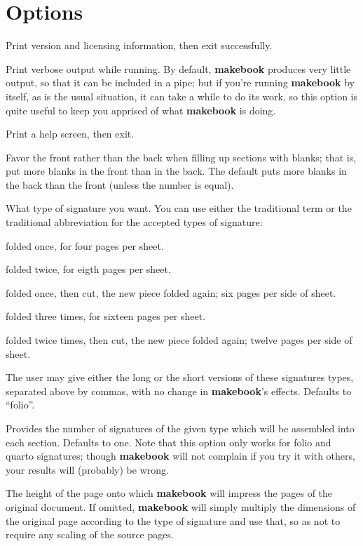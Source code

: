 \documentclass[12pt,twoside,final]{extarticle}
\begin{document}
\section{Options}
\begin{description}[noitemsep]
\item[-V]Print version and licensing information, then exit successfully.
\item[-v]Print verbose output while running. By default, \textbf{makebook} produces very little output, so that it can be included in a pipe; but if you're running \textbf{makebook} by itself, as is the usual situation, it can take a while to do its work, so this option is quite useful to keep you apprised of what \textbf{makebook} is doing.
\item[-h]Print a help screen, then exit.
\item[-f]Favor the front rather than the back when filling up sections with blanks; that is, put more blanks in the front than in the back. The default puts more blanks in the back than the front (unless the number is equal).
\item[-t signature type]What type of signature you want. You can use either the traditional term or the traditional abbreviation for the accepted types of signature:
\begin{description}[noitemsep]
\item[folio, 2o]folded once, for four pages per sheet.
\item[quarto, 4to]folded twice, for eigth pages per sheet.
\item[sexto, 6to]folded once, then cut, the new piece folded again; six pages per side of sheet.
\item[octavo, 8vo]folded three times, for sixteen pages per sheet.
\item[duodecimo, 12mo]folded twice times, then cut, the new piece folded again; twelve pages per side of sheet.
\end{description}
The  user  may  give  either the long or the short versions of these signatures types, separated above by commas, with no change in \textbf{makebook}'s effects. Defaults to ``folio''.
\item[-n signatures per section]Provides the number of signatures of the given type which will be assembled into each section. Defaults to one. Note that this option only works for folio and quarto signatures; though \textbf{makebook} will not complain if you try it with others, your results will (probably) be wrong.
\item[-H height of target page]The height of the page onto which \textbf{makebook} will impress the pages of the original document. If omitted, \textbf{makebook} will simply multiply the dimensions of the original page according to the type of signature and use that, so as not to require any scaling of the source pages.

\end{description}
\end{document}
